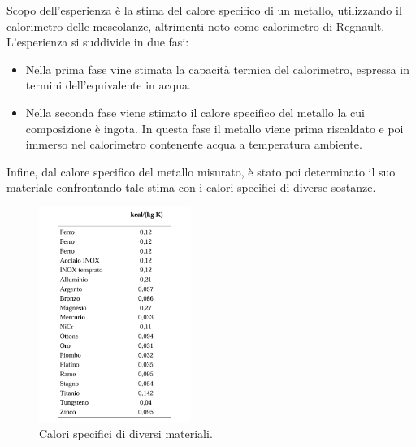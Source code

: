 Scopo dell'esperienza è la stima del calore specifico di un metallo, utilizzando il calorimetro delle mescolanze, altrimenti noto come calorimetro di Regnault. L'esperienza si suddivide in due fasi:
\begin{itemize}
    \item Nella prima fase vine stimata la capacità termica del calorimetro, espressa in termini dell'equivalente in acqua. 
    \item Nella seconda fase viene stimato il calore specifico del metallo la cui composizione è ingota. In questa fase il metallo viene prima riscaldato e poi immerso nel calorimetro contenente acqua a temperatura ambiente.
\end{itemize}
Infine, dal calore specifico del metallo misurato, è stato poi determinato il suo materiale confrontando tale stima con i calori specifici di diverse sostanze.

\begin{figure}[H]
	\centering
	\includegraphics[width=0.44\textwidth]{./figures/materiali}
	\caption{Calori specifici di diversi materiali.}
\end{figure}